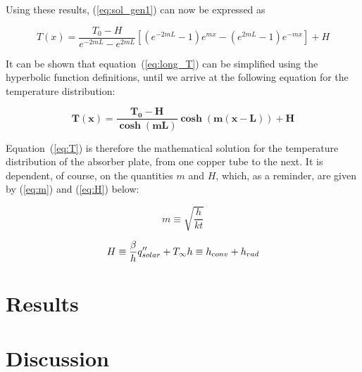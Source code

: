 \documentclass[]{article}
\begin{document}
Using these results, (\ref{eq:sol_gen1}) can now be expressed as

\begin{equation} \label{eq:long_T}
T(x) = \frac{T_0 - H}{e^{-2mL} - e^{2mL}}[(e^{-2mL}-1)e^{mx} - (e^{2mL}-1)e^{-mx}] + H
\end{equation}

It can be shown that equation~(\ref{eq:long_T}) can be simplified using the hyperbolic function definitions, until we arrive at the following equation for the temperature distribution:

\begin{equation} \label{eq:T}
\boldsymbol{T(x) = \frac{T_0 - H}{\cosh(mL)}\cosh(m(x-L)) + H}
\end{equation}

Equation~(\ref{eq:T}) is therefore the mathematical solution for the temperature distribution of the absorber plate, from one copper tube to the next. It is dependent, of course, on the quantities $m$ and $H$, which, as a reminder, are given by (\ref{eq:m}) and (\ref{eq:H}) below:

\begin{equation} \label{eq:m}
m \equiv \sqrt{\frac{h}{kt}}
\end{equation}

\begin{equation} \label{eq:H}
H \equiv \frac{\beta}{h}q''_{solar} + T_{\infty} \\
h \equiv h_{conv} + h_{rad}
\end{equation}

\section{Results}

\section{Discussion}
\end{document}
